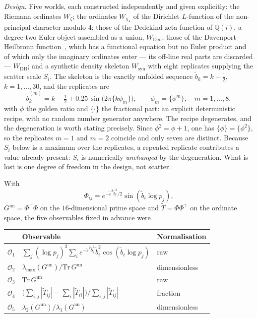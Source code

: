 \documentclass[11pt]{article}
\newcommand{\Tt}{\widetilde{T}}
\begin{document}
\emph{Design.} Five worlds, each constructed independently and given
explicitly: the Riemann ordinates $W_\zeta$; the ordinates $W_{\chi_4}$ of the
Dirichlet $L$-function of the non-principal character modulo $4$; those of the
Dedekind zeta function of $\mathbb{Q}(i)$, a degree-two Euler object assembled
as a union, $W_{\mathrm{Ded}}$; those of the Davenport--Heilbronn
function~\cite{DavenportHeilbronn36}, which has a functional equation but no
Euler product and of which only the imaginary ordinates enter --- its off-line
real parts are discarded --- $W_{\mathrm{DH}}$; and a synthetic density skeleton
$W_{\mathrm{syn}}$ with eight replicates supplying the scatter scale $S_i$.
The skeleton is the exactly unfolded sequence $\tilde b_k=k-\tfrac12$,
$k=1,\dots,30$, and the replicates are
\[
\tilde b_k^{(m)}=k-\tfrac12+0.25\,\sin\bigl(2\pi\{k\phi_m\}\bigr),
\qquad \phi_m=\{\phi^{m}\},\quad m=1,\dots,8,
\]
with $\phi$ the golden ratio and $\{\cdot\}$ the fractional part: an explicit
deterministic recipe, with no random number generator anywhere. The recipe
degenerates, and the degeneration is worth stating precisely. Since
$\phi^2=\phi+1$, one has $\{\phi\}=\{\phi^2\}$, so the replicates $m=1$ and
$m=2$ coincide and only seven are distinct. Because $S_i$ below is a maximum
over the replicates, a repeated replicate contributes a value already present:
$S_i$ is numerically \emph{unchanged} by the degeneration. What is lost is one
degree of freedom in the design, not scatter.

With
\[
\Phi_{ij}=e^{-\tilde\varepsilon^2\tilde b_i^2/2}\sin(\tilde b_i\log p_j),
\]
$G^{\mathrm{un}}=\Phi^{\!\top}\Phi$ on the $16$-dimensional prime space and
$\Tt=\Phi\Phi^{\!\top}$ on the ordinate space, the five observables fixed in
advance were

\begin{center}
\begin{tabular}{@{}cll@{}}
\toprule
 & Observable & Normalisation \\
\midrule
$\mathcal{O}_1$ & $\sum_j(\log p_j)^2\sum_i e^{-\tilde\varepsilon^2\tilde b_i^2}\tilde b_i^2\cos(\tilde b_i\log p_j)$
   & raw \\
$\mathcal{O}_2$ & $\lambda_{\max}(G^{\mathrm{un}})/\mathrm{Tr}\,G^{\mathrm{un}}$ & dimensionless \\
$\mathcal{O}_3$ & $\mathrm{Tr}\,G^{\mathrm{un}}$ & raw \\
$\mathcal{O}_4$ & $\bigl(\sum_{i,j}|\Tt_{ij}|-\sum_i|\Tt_{ii}|\bigr)/ \sum_{i,j}|\Tt_{ij}|$ & fraction \\
$\mathcal{O}_5$ & $\lambda_2(G^{\mathrm{un}})/\lambda_1(G^{\mathrm{un}})$ & dimensionless \\
\bottomrule
\end{tabular}
\end{center}
\end{document}
